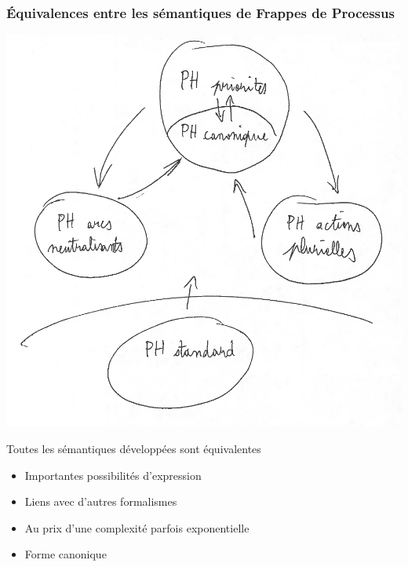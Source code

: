 
\begin{frame}[c]
  \frametitle{Équivalences entre les sémantiques de Frappes de Processus}

\begin{center}
\includegraphics[height=.5\textheight]{figs/PH1.png}
\end{center}

Toutes les sémantiques développées sont équivalentes
\begin{itemize}
  \item Importantes possibilités d'expression
  \item Liens avec d'autres formalismes
  \item Au prix d'une complexité parfois exponentielle
  \item Forme canonique
\end{itemize}

\end{frame}



